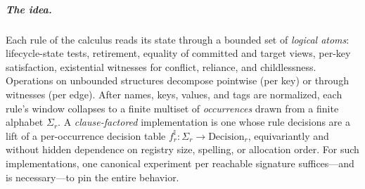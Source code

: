 \documentclass[sigplan,screen,review,nonacm]{acmart}
\newcommand{\Impl}{\ensuremath{\mathbb I}}
\newcommand{\occ}[1]{\ensuremath{\Sigma_{#1}}}
\begin{document}
\subparagraph{The idea.} Each rule of the calculus reads its state through a
bounded set of \emph{logical atoms}: lifecycle-state tests, retirement, equality
of committed and target views, per-key satisfaction, existential witnesses for
conflict, reliance, and childlessness. Operations on unbounded structures
decompose pointwise (per key) or through witnesses (per edge). After names, keys,
values, and tags are normalized, each rule's window collapses to a finite
multiset of \emph{occurrences} drawn from a finite alphabet $\occ r$. A
\emph{clause-factored} implementation is one whose rule decisions are a lift of a
per-occurrence decision table $f_r^{\Impl} : \occ r \to \mathrm{Decision}_r$,
equivariantly and without hidden dependence on registry size, spelling, or
allocation order. For such implementations, one canonical experiment per
reachable signature suffices---and is necessary---to pin the entire behavior.
\end{document}

